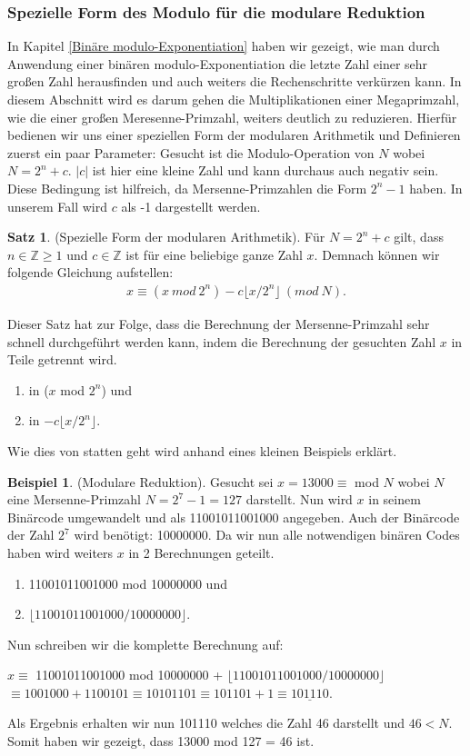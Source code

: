 \documentclass[12pt,a4paper]{article}
\theoremstyle{definition}
\newtheorem{satz}{Satz}[subsection]
\newtheorem{bsp}{Beispiel}[subsection]
\begin{document}
\subsubsection{Spezielle Form des Modulo für die modulare Reduktion}
In Kapitel \ref{Binäre modulo-Exponentiation} haben wir gezeigt, wie man durch Anwendung einer binären modulo-Exponentiation die letzte Zahl einer sehr großen Zahl herausfinden und auch weiters die Rechenschritte verkürzen kann.
In diesem Abschnitt wird es darum gehen die Multiplikationen einer Megaprimzahl, wie die einer großen Meresenne-Primzahl, weiters deutlich zu reduzieren.
Hierfür bedienen wir uns einer speziellen Form der modularen Arithmetik und Definieren zuerst ein paar Parameter:\newline
Gesucht ist die Modulo-Operation von $N$ wobei $N = 2^n + c$.\newline
$\vert c \vert$ ist hier eine kleine Zahl und kann durchaus auch negativ sein. Diese Bedingung ist hilfreich, da Mersenne-Primzahlen die Form $2^n-1$ haben.
In unserem Fall wird $c$ als -1 dargestellt werden.
\begin{satz}(Spezielle Form der modularen Arithmetik).\newline
Für $N = 2^n + c$ gilt, dass $n \in \mathbb{Z} \geq 1$ und $c \in \mathbb{Z}$ ist für eine beliebige ganze Zahl $x$.
Demnach können wir folgende Gleichung aufstellen:
\begin{align}
x \equiv (x\ mod\ 2^n) - c \lfloor x/2^n \rfloor\ (mod\ N).
\end{align}
\end{satz}
Dieser Satz hat zur Folge, dass die Berechnung der Mersenne-Primzahl sehr schnell durchgeführt werden kann, indem die Berechnung der gesuchten Zahl $x$ in Teile getrennt wird.
\begin{enumerate}
    \item in ($x$ mod $2^n$) und
    \item in $- c \lfloor x/2^n \rfloor$.
\end{enumerate}
Wie dies von statten geht wird anhand eines kleinen Beispiels erklärt.
\begin{bsp}(Modulare Reduktion).\newline
Gesucht sei $x = 13000 \equiv$ mod $N$ wobei $N$ eine Mersenne-Primzahl $N = 2^7 - 1 =127$ darstellt.
Nun wird $x$ in seinem Binärcode umgewandelt und als 11001011001000 angegeben.
Auch der Binärcode der Zahl $2^7$ wird benötigt: 10000000.
Da wir nun alle notwendigen binären Codes haben wird weiters $x$ in 2 Berechnungen geteilt.
\begin{enumerate}
    \item 11001011001000 mod 10000000 und
    \item $\lfloor11001011001000/10000000\rfloor$.
\end{enumerate}
Nun schreiben wir die komplette Berechnung auf:
\begin{center}
$x \equiv$ 11001011001000 mod 10000000 + $\lfloor11001011001000/10000000\rfloor$ $\equiv 1001000 + 1100101 \equiv 10101101 \equiv 101101 + 1 \equiv \underline{101110}$.
\end{center}
Als Ergebnis erhalten wir nun 101110 welches die Zahl 46 darstellt und $46 < N$.
Somit haben wir gezeigt, dass 13000 mod 127 = 46 ist.
\end{bsp}
\end{document}

